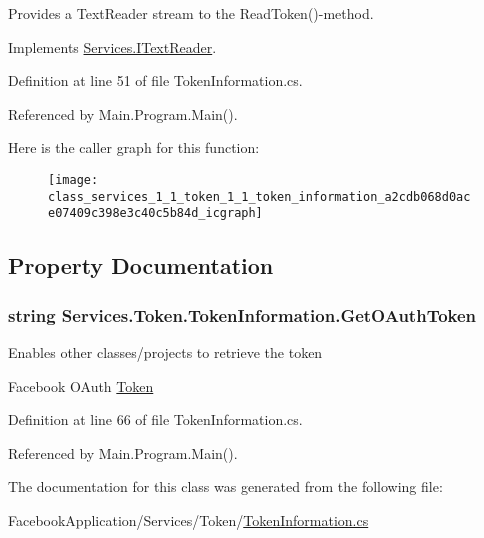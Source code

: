 Provides a Text\+Reader stream to the Read\+Token()-\/method. 



Implements \hyperlink{interface_services_1_1_i_text_reader_a670edc32225de1bcaf9942b4acc1edaf}{Services.\+I\+Text\+Reader}.



Definition at line 51 of file Token\+Information.\+cs.



Referenced by Main.\+Program.\+Main().



Here is the caller graph for this function\+:
\nopagebreak
\begin{figure}[H]
\begin{center}
\leavevmode
\texttt{[image: class\_services\_1\_1\_token\_1\_1\_token\_information\_a2cdb068d0ace07409c398e3c40c5b84d\_icgraph]}
\end{center}
\end{figure}




\subsection{Property Documentation}
\subsubsection[{\texorpdfstring{Get\+O\+Auth\+Token}{GetOAuthToken}}]{\setlength{\rightskip}{0pt plus 5cm}string Services.\+Token.\+Token\+Information.\+Get\+O\+Auth\+Token\hspace{0.3cm}{\ttfamily [get]}}\hypertarget{class_services_1_1_token_1_1_token_information_a553143fafe504da889f94942961ceb41}{}\label{class_services_1_1_token_1_1_token_information_a553143fafe504da889f94942961ceb41}


Enables other classes/projects to retrieve the token 

Facebook O\+Auth \hyperlink{namespace_services_1_1_token}{Token}

Definition at line 66 of file Token\+Information.\+cs.



Referenced by Main.\+Program.\+Main().



The documentation for this class was generated from the following file\+:\begin{DoxyCompactItemize}
\item 
Facebook\+Application/\+Services/\+Token/\hyperlink{_token_information_8cs}{Token\+Information.\+cs}\end{DoxyCompactItemize}
